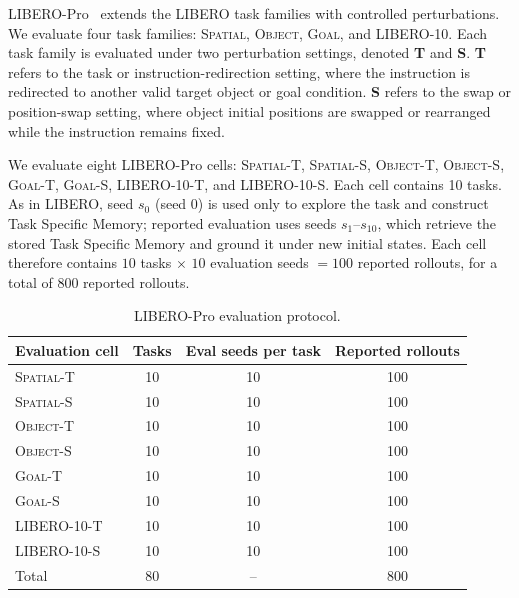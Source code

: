 \documentclass[11pt]{article}
\begin{document}
LIBERO-Pro~\citep{Lagrange1788} extends the LIBERO task families with controlled perturbations. We evaluate four task families: \textsc{Spatial}, \textsc{Object}, \textsc{Goal}, and \textsc{LIBERO-10}. Each task family is evaluated under two perturbation settings, denoted \textbf{T} and \textbf{S}. \textbf{T} refers to the task or instruction-redirection setting, where the instruction is redirected to another valid target object or goal condition. \textbf{S} refers to the swap or position-swap setting, where object initial positions are swapped or rearranged while the instruction remains fixed.

We evaluate eight LIBERO-Pro cells: \textsc{Spatial-T}, \textsc{Spatial-S}, \textsc{Object-T}, \textsc{Object-S}, \textsc{Goal-T}, \textsc{Goal-S}, \textsc{LIBERO-10-T}, and \textsc{LIBERO-10-S}. Each cell contains 10 tasks. As in LIBERO, seed $s_0$ (seed 0) is used only to explore the task and construct Task Specific Memory; reported evaluation uses seeds $s_1$--$s_{10}$, which retrieve the stored Task Specific Memory and ground it under new initial states. Each cell therefore contains $10$ tasks $\times$ $10$ evaluation seeds $=100$ reported rollouts, for a total of 800 reported rollouts.

\begin{table}[h]
    \centering
    \caption{LIBERO-Pro evaluation protocol.}
    \label{tab:app_liberopro_protocol}
    \begin{tabular}{lccc}
        \toprule
        Evaluation cell & Tasks & Eval seeds per task & Reported rollouts \\
        \midrule
        \textsc{Spatial-T}   & 10 & 10 & 100 \\
        \textsc{Spatial-S}   & 10 & 10 & 100 \\
        \textsc{Object-T}    & 10 & 10 & 100 \\
        \textsc{Object-S}    & 10 & 10 & 100 \\
        \textsc{Goal-T}      & 10 & 10 & 100 \\
        \textsc{Goal-S}      & 10 & 10 & 100 \\
        \textsc{LIBERO-10-T} & 10 & 10 & 100 \\
        \textsc{LIBERO-10-S} & 10 & 10 & 100 \\
        \midrule
        Total & 80 & -- & 800 \\
        \bottomrule
    \end{tabular}
\end{table}
\end{document}
